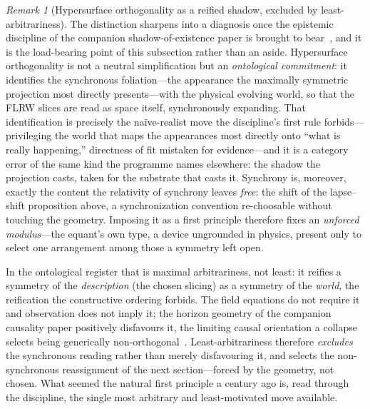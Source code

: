 \documentclass[11pt,a4paper]{article}
\theoremstyle{plain}
\theoremstyle{definition}
\theoremstyle{remark}
\newtheorem{remark}{Remark}
\begin{document}
\begin{remark}[Hypersurface orthogonality as a reified shadow, excluded by least-arbitrariness]
The distinction sharpens into a diagnosis once the epistemic discipline of the companion shadow-of-existence paper is brought to bear~\cite{JanzenShadowExistence}, and it is the load-bearing point of this subsection rather than an aside. Hypersurface orthogonality is not a neutral simplification but an \emph{ontological commitment}: it identifies the synchronous foliation---the appearance the maximally symmetric projection most directly presents---with the physical evolving world, so that the FLRW slices are read as space itself, synchronously expanding. That identification is precisely the na\"ive-realist move the discipline's first rule forbids---privileging the world that maps the appearances most directly onto ``what is really happening,'' directness of fit mistaken for evidence---and it is a category error of the same kind the programme names elsewhere: the shadow the projection casts, taken for the substrate that casts it. Synchrony is, moreover, exactly the content the relativity of synchrony leaves \emph{free}: the shift of the lapse--shift proposition above, a synchronization convention re-choosable without touching the geometry. Imposing it as a first principle therefore fixes an \emph{unforced modulus}---the equant's own type, a device ungrounded in physics, present only to select one arrangement among those a symmetry left open.

In the ontological register that is maximal arbitrariness, not least: it reifies a symmetry of the \emph{description} (the chosen slicing) as a symmetry of the \emph{world}, the reification the constructive ordering forbids. The field equations do not require it and observation does not imply it; the horizon geometry of the companion causality paper positively disfavours it, the limiting causal orientation a collapse selects being generically non-orthogonal~\cite{JanzenBHcausality}. Least-arbitrariness therefore \emph{excludes} the synchronous reading rather than merely disfavouring it, and selects the non-synchronous reassignment of the next section---forced by the geometry, not chosen. What seemed the natural first principle a century ago is, read through the discipline, the single most arbitrary and least-motivated move available.


\end{remark}
\end{document}
